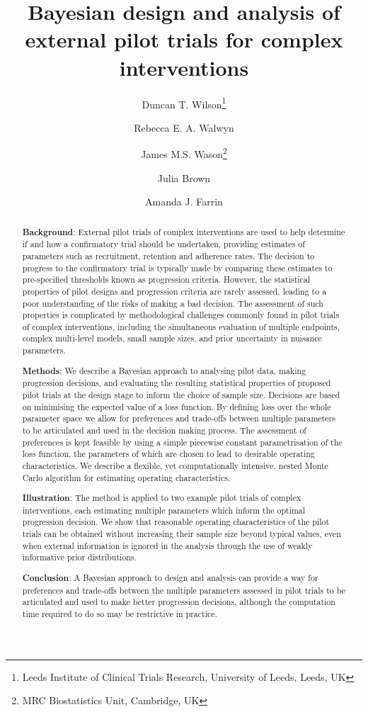 \documentclass{article} %
\title{Bayesian design and analysis of external pilot trials for complex interventions}
\author{Duncan T. Wilson\thanks{Leeds Institute of Clinical Trials Research, University of Leeds, Leeds, UK}  \and Rebecca E. A. Walwyn\footnotemark[1] \and James M.S. Wason\thanks{MRC Biostatistics Unit, Cambridge, UK} \and Julia Brown\footnotemark[1] \and Amanda J. Farrin\footnotemark[1]}
\date{}
\begin{document}
\maketitle

\begin{abstract}

\noindent\textbf{Background}: External pilot trials of complex interventions are used to help determine if and how a confirmatory trial should be undertaken, providing estimates of parameters such as recruitment, retention and adherence rates. The decision to progress to the confirmatory trial is typically made by comparing these estimates to pre-specified thresholds known as progression criteria. However, the statistical properties of pilot designs and progression criteria are rarely assessed, leading to a poor understanding of the risks of making a bad decision. The assessment of such properties is complicated by methodological challenges commonly found in pilot trials of complex interventions, including the simultaneous evaluation of multiple endpoints, complex multi-level models, small sample sizes, and prior uncertainty in nuisance parameters.

\noindent\textbf{Methods}: We describe a Bayesian approach to analysing pilot data, making progression decisions, and evaluating the resulting statistical properties of proposed pilot trials at the design stage to inform the choice of sample size. Decisions are based on minimising the expected value of a loss function. By defining loss over the whole parameter space we allow for preferences and trade-offs between multiple parameters to be articulated and used in the decision making process. The assessment of preferences is kept feasible by using a simple piecewise constant parametrisation of the loss function, the parameters of which are chosen to lead to desirable operating characteristics. We describe a flexible, yet computationally intensive, nested Monte Carlo algorithm for estimating operating characteristics.

\noindent\textbf{Illustration}: The method is applied to two example pilot trials of complex interventions, each estimating multiple parameters which inform the optimal progression decision. We show that reasonable operating characteristics of the pilot trials can be obtained without increasing their sample size beyond typical values, even when external information is ignored in the analysis through the use of weakly informative prior distributions. 

\noindent\textbf{Conclusion}: A Bayesian approach to design and analysis can provide a way for preferences and trade-offs between the multiple parameters assessed in pilot trials to be articulated and used to make better progression decisions, although the computation time required to do so may be restrictive in practice.

\end{abstract}
\end{document}

